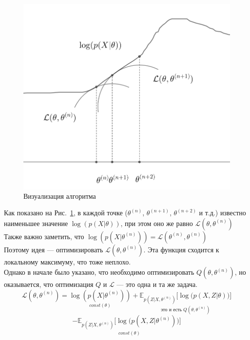 \begin{figure}[h]
    \begin{center}
        \includegraphics[scale=0.45]{src/Design/assets/em_visualisation.png}
    \end{center}
    \caption{Визуализация алгоритма}\label{fig:em_visual}
\end{figure}

\noindent Как показано на Рис.~\ref{fig:em_visual}, в каждой точке  ($\theta^{(n)}$, $\theta^{(n+1)}$, $\theta^{(n+2)}$ и т.д.) известно наименьшее значение $\log(p(X|\theta))$, при этом оно же равно $\mathcal{L}(\theta, \theta^{(n)})$
\\
Также важно заметить, что $\log(p(X|\theta^{(n)})) = \mathcal{L}(\theta^{(n)}, \theta^{(n)})$
\\
Поэтому идея --- оптимизировать $\mathcal{L}(\theta, \theta^{(n)})$. Эта функция сходится к локальному максимуму, что тоже неплохо.
\\
Однако в начале было указано, что необходимо оптимизировать $Q(\theta, \theta^{(n)})$, но оказывается, что оптимизация $Q$ и $\mathcal{L}$ --- это одна и та же задача.
\\
\[ \mathcal{L}(\theta, \theta^{(n)}) = \underset{const(\theta)}{\log(p(X|\theta^{(n)}))} + \underset{\text{это и есть } Q(\theta, \theta^{(n)})}{\mathbb{E}_{p(Z|X,\theta^{(n)})}\Big[\log\big(p(X,Z|\theta) \big) \Big]}\]
\[- \underset{const(\theta)}{\mathbb{E}_{p(Z|X,\theta^{(n)})}\Big[\log\big(p(X,Z|\theta^{(n)})\big)\Big]}
    \]

